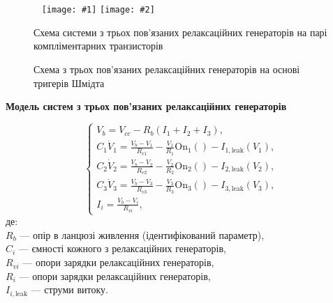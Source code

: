 \documentclass[14pt,handout,utf8]{beamer}
\newlength\DDP
\newcommand{\Xhead}[1]{
 \begin{center}%
      \textbf{#1}%
 \end{center}%
}
\newcommand{\PicDoubleNL}[2]{%
 \begin{center}
    ~ \hfill
    \texttt{[image: \#1]}
    \hfill
    \texttt{[image: \#2]}
    \hfill ~
  \end{center}
}
\begin{document}
\begin{frame}
  \frametitle{~}
  \begin{figure}[htb!]
    \PicDoubleNL{../p7/p/relax3d_board.jpg}{../p7/p/relax3ds_board.jpg}
    \parbox[t]{\DDP} {
      \caption{Схема системи з трьох пов'язаних релаксаційних генераторів на парі компліментарних транзисторів}
      \label{atu:f:relax3d_board}
    }
    \hfill
    \parbox[t]{\DDP} {
      \caption{Схема з трьох пов'язаних релаксаційних генераторів на основі тригерів Шмідта}
      \label{atu:f:relax3ds_board}
    }
  \end{figure}

  \Xhead{Модель систем з трьох пов'язаних релаксаційних генераторів}

  \begin{equation}
  \begin{cases}
    V_b = V_{cc} - R_b ( I_1 + I_2 + I_3 ), \\
      C_1 \dot{V}_1 = \frac{V_b-V_1}{R_{v1}} - \frac{V_1}{R_1} \mathrm{On}_1() - I_{1,\mathrm{leak}}(V_1), \\
      C_2 \dot{V}_2 = \frac{V_b-V_2}{R_{v2}} - \frac{V_2}{R_2} \mathrm{On}_2() - I_{2,\mathrm{leak}}(V_2), \\
      C_3 \dot{V}_3 = \frac{V_b-V_3}{R_{v3}} - \frac{V_3}{R_3} \mathrm{On}_3() - I_{3,\mathrm{leak}}(V_3), \\
      I_i = \frac{V_b-V_i}{R_{vi}},
  \end{cases}
  \label{atu:eq:relax3}
\end{equation}
%
де: \\
$R_b $ --- опір в ланцюзі живлення (ідентифікований параметр), \\
$C_i $ --- ємності кожного з релаксаційних генераторів, \\
$R_{vi} $ --- опори зарядки релаксаційних генераторів, \\
$R_{ i} $ --- опори зарядки релаксаційних генераторів, \\
$I_{i, \mathrm{leak}} $ --- струми витоку.


\end{frame}


\end{document}
